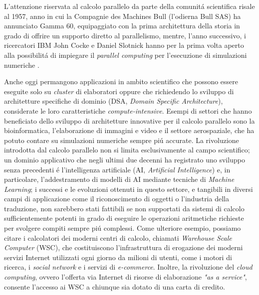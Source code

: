 \nocite{Spirito2021}
L'attenzione riservata al calcolo parallelo da parte della comunit\'a
scientifica risale al 1957, anno in cui la
Compagnie des Machines Bull (l'odierna Bull SAS) ha annunciato Gamma 60,
equipaggiato con la prima architettura della storia in grado di offrire un supporto diretto
al parallelismo, mentre, l'anno successivo, i ricercatori IBM John
Cocke e Daniel Slotnick hanno per la prima volta aperto alla
possibilit\'a di impiegare il \textit{parallel computing} per
l'esecuzione di simulazioni numeriche \cite{Wilson1994}.

Anche oggi permangono applicazioni in ambito scientifico
che possono essere eseguite
solo su \textit{cluster} di elaboratori oppure che richiedendo lo sviluppo di architetture specifiche di dominio (DSA, \textit{Domain Specific Architecture}), considerate le loro caratteristiche \textit{compute-intensive}.\newline
Esempi di settori che hanno beneficiato dello sviluppo di
architetture innovative per il calcolo parallelo sono la
bioinformatica, l'elaborazione di immagini e video
e il settore aerospaziale, che ha potuto contare su simulazioni
numeriche sempre pi\'u accurate.\newline
La rivoluzione introdotta dal calcolo parallelo non si limita esclusivamente al campo scientifico; un dominio applicativo che negli ultimi due decenni ha registrato uno sviluppo senza precedenti \'e l'intelligenza artificiale (AI, \textit{Artificial Intelligence}) e, in particolare, l'addestramento di modelli di AI mediante tecniche di \textit{Machine Learning}; i successi e le evoluzioni ottenuti in questo settore, e tangibili in diversi campi di applicazione come il riconoscimento di oggetti o l'industria della traduzione, non sarebbero stati fattibili se non supportati da sistemi di calcolo sufficientemente potenti in grado di eseguire le operazioni aritmetiche richieste per svolgere compiti sempre pi\'u complessi.\newline
Come ulteriore esempio, possiamo citare i calcolatori dei moderni centri di calcolo, chiamati \textit{Warehouse Scale Computer} (WSC), che costituiscono l'infrastruttura di erogazione dei moderni servizi Internet utilizzati ogni giorno da milioni di utenti, come i motori di ricerca, i \textit{social network} e i servizi di \textit{e-commerce}. Inoltre, la rivoluzione del \textit{cloud computing}, ovvero l'offerta via Internet di risorse di elaborazione \textit{"as a service"}, consente l'accesso ai WSC a chiunque sia dotato di una carta di credito.

